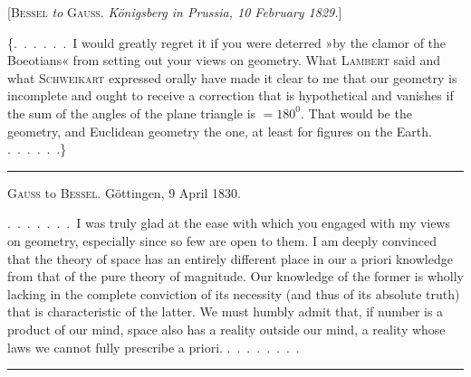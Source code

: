 \begin{center}
[\textsc{Bessel} \emph{to} \textsc{Gauss}. \emph{Königsberg in Prussia, 10 February 1829.}]
\end{center}

\{.\ .\ .\ .\ .\ .\ I would greatly regret it if you were deterred »by the clamor of the
Boeotians« from setting out your views on geometry.
What \textsc{Lambert} said and what \textsc{Schweikart} expressed orally
have made it clear to me that our geometry is incomplete and ought to receive a correction that is hypothetical and vanishes if the sum of the
angles of the plane triangle is $=180^{0}$. That would be the 
geometry, and Euclidean geometry the  one, at least for figures on the
Earth. .\ .\ .\ .\ .\ .\}

\rule{4cm}{0.5pt}

\begin{center}
\textsc{Gauss} to \textsc{Bessel}. Göttingen, 9 April 1830.
\end{center}

.\ .\ .\ .\ .\ .\ .\ I was truly glad at the ease with which you
engaged with my views on geometry, especially since so few
are open to them. I am deeply convinced that the theory of space has an entirely different place in our a priori knowledge from that of the pure
theory of magnitude. Our knowledge of the former is wholly lacking in the complete conviction of its necessity (and thus of its absolute
truth) that is characteristic of the latter. We must humbly admit
that, if number is  a product of our mind, space also has a reality outside
our mind, a reality whose laws we cannot fully prescribe a priori. .\ .\ .\ .\ .\ .\ .\ .

\rule{4cm}{0.5pt}

